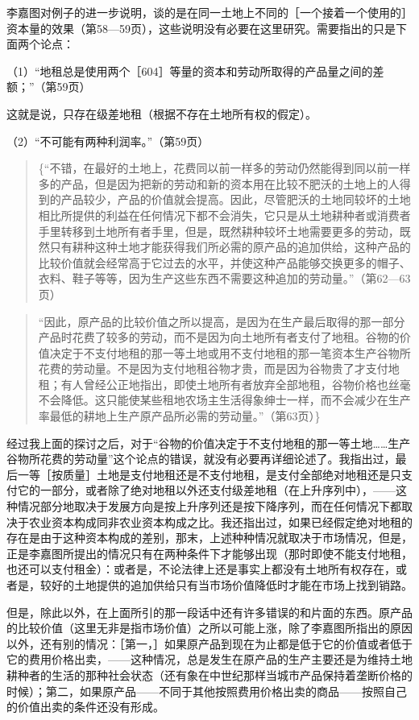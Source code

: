李嘉图对例子的进一步说明，谈的是在同一土地上不同的［一个接着一个使用的］资本量的效果（第58—59页），这些说明没有必要在这里研究。需要指出的只是下面两个论点：

（1）“地租总是使用两个［604］等量的资本和劳动所取得的产品量之间的差额；”（第59页）

这就是说，只存在级差地租（根据不存在土地所有权的假定）。

（2）“不可能有两种利润率。”（第59页）

\begin{quote}\{“不错，在最好的土地上，花费同以前一样多的劳动仍然能得到同以前一样多的产品，但是因为把新的劳动和新的资本用在比较不肥沃的土地上的人得到的产品较少，产品的价值就会提高。因此，尽管肥沃的土地同较坏的土地相比所提供的利益在任何情况下都不会消失，它只是从土地耕种者或消费者手里转移到土地所有者手里，但是，既然耕种较坏土地需要更多的劳动，既然只有耕种这种土地才能获得我们所必需的原产品的追加供给，这种产品的比较价值就会经常高于它过去的水平，并使这种产品能够交换更多的帽子、衣料、鞋子等等，因为生产这些东西不需要这种追加的劳动量。”（第62—63页）\end{quote}

\begin{quote}“因此，原产品的比较价值之所以提高，是因为在生产最后取得的那一部分产品时花费了较多的劳动，而不是因为向土地所有者支付了地租。谷物的价值决定于不支付地租的那一等土地或用不支付地租的那一笔资本生产谷物所花费的劳动量。不是因为支付地租谷物才贵，而是因为谷物贵了才支付地租；有人曾经公正地指出，即使土地所有者放弃全部地租，谷物价格也丝毫不会降低。这只能使某些租地农场主生活得象绅士一样，而不会减少在生产率最低的耕地上生产原产品所必需的劳动量。”（第63页）\}\end{quote}

经过我上面的探讨之后，对于“谷物的价值决定于不支付地租的那一等土地……生产谷物所花费的劳动量”这个论点的错误，就没有必要再详细论述了。我指出过，最后一等［按质量］土地是支付地租还是不支付地租，是支付全部绝对地租还是只支付它的一部分，或者除了绝对地租以外还支付级差地租（在上升序列中），——这种情况部分地取决于发展方向是按上升序列还是按下降序列，而在任何情况下都取决于农业资本构成同非农业资本构成之比。我还指出过，如果已经假定绝对地租的存在是由于这种资本构成的差别，那末，上述种种情况就取决于市场情况，但是，正是李嘉图所提出的情况只有在两种条件下才能够出现（那时即使不能支付地租，也还可以支付租金）：或者是，不论法律上还是事实上都没有土地所有权存在，或者是，较好的土地提供的追加供给只有当市场价值降低时才能在市场上找到销路。

但是，除此以外，在上面所引的那一段话中还有许多错误的和片面的东西。原产品的比较价值（这里无非是指市场价值）之所以可能上涨，除了李嘉图所指出的原因以外，还有别的情况：［第一，］如果原产品到现在为止都是低于它的价值或者低于它的费用价格出卖，——这种情况，总是发生在原产品的生产主要还是为维持土地耕种者的生活的那种社会状态（还有象在中世纪那样当城市产品保持着垄断价格的时候）；第二，如果原产品——不同于其他按照费用价格出卖的商品——按照自己的价值出卖的条件还没有形成。

